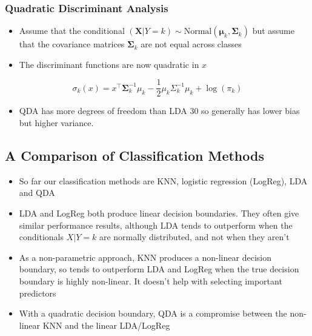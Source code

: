 \documentclass[11pt]{article}
\providecommand{\tightlist}{%
      \setlength{\itemsep}{0pt}\setlength{\parskip}{0pt}}
\begin{document}
    \hypertarget{quadratic-discriminant-analysis}{%
\subsubsection{Quadratic Discriminant
Analysis}\label{quadratic-discriminant-analysis}}

    \begin{itemize}
\item
  Assume that the conditional
  \((\mathbf{X}| Y = k) \sim \text{Normal}(\boldsymbol{\mu}_k, \boldsymbol{\Sigma}_k)\)
  but assume that the covariance matrices \(\boldsymbol{\Sigma}_k\) are
  not equal across classes
\item
  The discriminant functions are now quadratic in \(x\)
\end{itemize}

\[\sigma_k(x) = x^\top\boldsymbol{\Sigma}_k^{-1}\mu_k - \frac{1}{2}\mu_k {\Sigma}_k^{-1} \mu_k + \log(\pi_k)\]

\begin{itemize}
\tightlist
\item
  QDA has more degrees of freedom than LDA 30 so generally has lower
  bias but higher variance.
\end{itemize}

    \hypertarget{a-comparison-of-classification-methods}{%
\subsection{A Comparison of Classification
Methods}\label{a-comparison-of-classification-methods}}

    \begin{itemize}
\item
  So far our classification methods are KNN, logistic regression
  (LogReg), LDA and QDA
\item
  LDA and LogReg both produce linear decision boundaries. They often
  give similar performance results, although LDA tends to outperform
  when the conditionals \(X | Y = k\) are normally distributed, and not
  when they aren't
\item
  As a non-parametric approach, KNN produces a non-linear decision
  boundary, so tends to outperform LDA and LogReg when the true decision
  boundary is highly non-linear. It doesn't help with selecting
  important predictors
\item
  With a quadratic decision boundary, QDA is a compromise between the
  non-linear KNN and the linear LDA/LogReg
\end{itemize}
\end{document}
